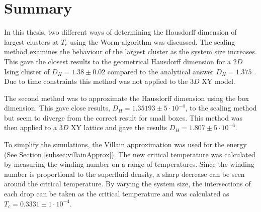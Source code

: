 \section{Summary}
\label{sec:Summary}

In this thesis, two different ways of determining the Hausdorff dimension of largest clusters at $T_c$ using the Worm algorithm was discussed. The scaling method examines the behaviour of the largest cluster as the system size increases. This gave the closest results to the geometrical Hausdorff dimension for a $2D$ Ising cluster of $D_H = 1.38 \pm 0.02$ compared to the analytical answer $D_H = 1.375$ \cite{Duplantier:GeoHausdorff}. Due to time constraints this method was not applied to the $3D$ XY model.

The second method was to approximate the Hausdorff dimension using the box dimension. This gave close results, $D_H = 1.35193 \pm 5 \cdot 10^{-4}$, to the scaling method but seem to diverge from the correct result for small boxes. This method was then applied to a $3D$ XY lattice and gave the results $D_H = 1.807 \pm 5 \cdot 10^{-6}$.

To simplify the simulations, the Villain approximation was used for the energy (See Section \ref{subsec:villainApprox}). The new critical temperature was calculated by measuring the winding number on a range of temperatures. Since the winding number is proportional to the superfluid density, a sharp decrease can be seen around the critical temperature. By varying the system size, the intersections of each drop can be taken as the critical temperature and was calculated as $T_c = 0.3331 \pm 1 \cdot 10^{-4}$.